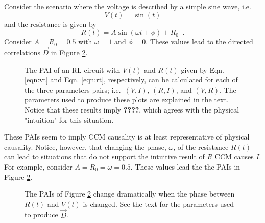 \documentclass[a4paper,11pt]{article}
\begin{document}
Consider the scenario where the voltage is described by a simple sine wave, i.e.\
\begin{equation}
\label{eqn:vt}
V(t) = \sin(t)
\end{equation}
and the resistance is given by
\begin{equation}
\label{eqn:rt}
R(t) = A\sin(\omega t + \phi) + R_0\;\;.
\end{equation}
Consider $A=R_0=0.5$ with $\omega=1$ and $\phi=0$.  These values lead to the directed correlations $\vec{D}$ in Figure \ref{fig:}.  
\begin{figure}[ht]
\label{fig:}
\caption{The PAI of an RL circuit with $V(t)$ and $R(t)$ given by Eqn. \ref{eqn:vt} and Eqn. \ref{eqn:rt}, respectively, can be calculated for each of the three parameters pairs; i.e.\ $(V,I)$, $(R,I)$, and $(V,R)$.  The parameters used to produce these plots are explained in the text.  Notice that these results imply {\bf ????}, which agrees with the physical "intuition" for this situation.}
\end{figure}
These PAIs seem to imply CCM causality is at least representative of physical causality.  Notice, however, that changing the phase, $\omega$, of the resistance $R(t)$ can lead to situations that do not support the intuitive result of $R$ CCM causes $I$.  For example, consider $A=R_0=\omega=0.5$.  These values lead the the PAIs in Figure \ref{fig:}.
\begin{figure}[ht]
\label{fig:}
\caption{The PAIs of Figure \ref{fig:} change dramatically when the phase between $R(t)$ and $V(t)$ is changed.  See the text for the parameters used to produce $\vec{D}$.}
\end{figure}
\end{document}

